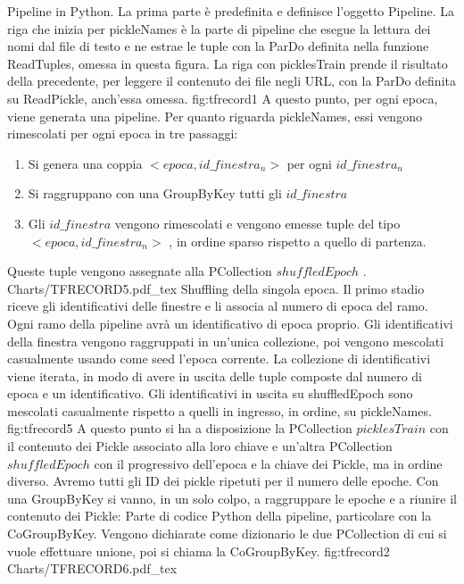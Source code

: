 {Pipeline in Python. La prima parte è predefinita e definisce l'oggetto Pipeline. La riga che inizia per pickleNames è la parte di pipeline che esegue la lettura dei nomi dal file di testo e ne estrae le tuple con la ParDo definita nella funzione ReadTuples, omessa in questa figura. La riga con picklesTrain prende il risultato della precedente, per leggere il contenuto dei file negli URL, con la ParDo definita su ReadPickle, anch'essa omessa. }
{fig:tfrecord1}
A questo punto, per ogni epoca, viene generata una pipeline. Per quanto riguarda pickleNames, essi vengono rimescolati per ogni epoca in tre passaggi:
\begin{enumerate}
\item Si genera una coppia $ <epoca, id\_finestra_n> $ per ogni $ id\_finestra_n $
\item Si raggruppano con una GroupByKey tutti gli $ id\_finestra $
\item Gli $ id\_finestra $ vengono rimescolati e vengono emesse tuple del tipo $ <epoca, id\_finestra_n> $ , in ordine sparso rispetto a quello di partenza.
\end{enumerate}
Queste tuple vengono assegnate alla PCollection $ shuffledEpoch $ .
\svg
{Charts/TFRECORD5.pdf_tex}
{Shuffling della singola epoca. Il primo stadio riceve gli identificativi delle finestre e li associa al numero di epoca del ramo. Ogni ramo della pipeline avrà un identificativo di epoca proprio. Gli identificativi della finestra vengono raggruppati in un'unica collezione, poi vengono mescolati casualmente usando come seed l'epoca corrente. La collezione di identificativi viene iterata, in modo di avere in uscita delle tuple composte dal numero di epoca e un identificativo. Gli identificativi in uscita su shuffledEpoch sono mescolati casualmente rispetto a quelli in ingresso, in ordine, su pickleNames. }
{fig:tfrecord5}
A questo punto si ha a disposizione la PCollection $ picklesTrain $ con il contenuto dei Pickle associato alla loro chiave e un’altra PCollection $ shuffledEpoch $ con il progressivo dell’epoca e la chiave dei Pickle, ma in ordine diverso. Avremo tutti gli ID dei pickle ripetuti per il numero delle epoche. Con una GroupByKey si vanno, in un solo colpo, a raggruppare le epoche e a riunire il contenuto dei Pickle:
{Parte di codice Python della pipeline, particolare con la CoGroupByKey. Vengono dichiarate come dizionario le due PCollection di cui si vuole effettuare unione, poi si chiama la CoGroupByKey.}
{fig:tfrecord2}
\svg
{Charts/TFRECORD6.pdf_tex}
